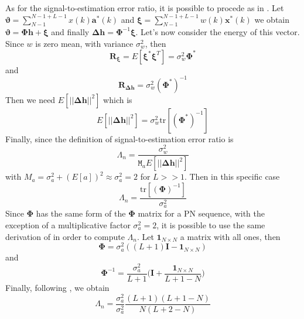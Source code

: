 \documentclass[10pt]{article}
\newcommand{\M} {\mathtt{M}}
\begin{document}
As for the signal-to-estimation error ratio, it is possible to procede as in \cite{bc}. Let $\boldsymbol{\vartheta} = \sum_{N-1}^{N-1+L-1} x(k) \mathbf{a}^*(k)$ and $\boldsymbol{\xi} = \sum_{N-1}^{N-1+L-1} w(k) \mathbf{x}^*(k)$ we obtain $\boldsymbol{\vartheta} = \boldsymbol{\Phi}\mathbf{h} + \boldsymbol{\xi}$ and finally $\boldsymbol{\Delta h} = \boldsymbol{\Phi}^{-1} \boldsymbol{\xi}$. 
Let's now consider the energy of this vector. Since $w$ is zero mean, with variance $\sigma_w^2$, then
\begin{equation}
	\mathbf{R}_{\boldsymbol{\xi}} = E[\boldsymbol{\xi}^*\boldsymbol{\xi}^T] = \sigma_w^2 \mathbf{\Phi}^*
\end{equation}
and
\begin{equation}
	\mathbf{R}_{\boldsymbol{\Delta h}} = \sigma_w^2 (\mathbf{\Phi}^*)^{-1}
\end{equation}
Then we need $E[||\mathbf{\Delta h}||^2]$ which is
\begin{equation}
	E[||\mathbf{\Delta h}||^2] = \sigma_w^2 \mbox{tr}[(\mathbf{\Phi}^*)^{-1}]
\end{equation}
Finally, since the definition of signal-to-estimation error ratio is 
\begin{equation}
	\Lambda_n = \frac{\sigma_w^2}{\M_a E[||\mathbf{\Delta h}||^2]}
\end{equation}
with $M_a = \sigma_a^2 + (E[a])^2 \approx \sigma_a^2 = 2$ for $L >> 1$. Then in this specific case
\begin{equation}
	\Lambda_n = \frac{\mbox{tr}[(\mathbf{\Phi})^{-1}]}{\sigma_a^2}
\end{equation}
Since $\mathbf{\Phi}$ has the same form of the $\mathbf{\Phi}$ matrix for a PN sequence, with the exception of a multiplicative factor $\sigma_a^2 = 2$, it is possible to use the same derivation of \cite{bc} in order to compute $\Lambda_n$. Let $\mathbf{1}_{N\times N}$ a matrix with all ones, then
\begin{equation}
	\mathbf{\Phi} = \sigma_a^2 ((L+1)\mathbf{I} - \mathbf{1}_{N\times N})
\end{equation}
and
\begin{equation}
	\mathbf{\Phi}^{-1} = \frac{\sigma_a^2}{L+1} \bigg( \mathbf{I} + \frac{\mathbf{1}_{N\times N}}{L+1-N} \bigg)
\end{equation}
Finally, following \cite{bc}, we obtain
\begin{equation}
	\Lambda_n = \frac{\sigma_a^2}{\sigma_a^2}\frac{(L+1)(L+1-N)}{N(L+2-N)}
	\label{eq:lambdateo}
\end{equation}
\end{document}
